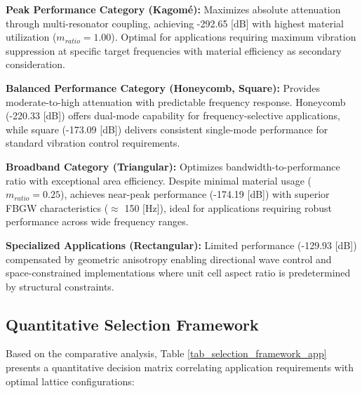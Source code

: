 \documentclass[review,numbers,sort&compress]{elsarticle}
\begin{document}
{\textbf{Peak Performance Category (Kagomé):} Maximizes absolute attenuation through multi-resonator coupling, achieving -292.65 [dB] with highest material utilization ($m_{ratio} = 1.00$). Optimal for applications requiring maximum vibration suppression at specific target frequencies with material efficiency as secondary consideration.

\textbf{Balanced Performance Category (Honeycomb, Square):} Provides moderate-to-high attenuation with predictable frequency response. Honeycomb (-220.33 [dB]) offers dual-mode capability for frequency-selective applications, while square (-173.09 [dB]) delivers consistent single-mode performance for standard vibration control requirements.

\textbf{Broadband Category (Triangular):} Optimizes bandwidth-to-performance ratio with exceptional area efficiency. Despite minimal material usage ($m_{ratio} = 0.25$), achieves near-peak performance (-174.19 [dB]) with superior FBGW characteristics ($\approx$ 150 [Hz]), ideal for applications requiring robust performance across wide frequency ranges.

\textbf{Specialized Applications (Rectangular):} Limited performance (-129.93 [dB]) compensated by geometric anisotropy enabling directional wave control and space-constrained implementations where unit cell aspect ratio is predetermined by structural constraints.

\subsection{Quantitative Selection Framework}

Based on the comparative analysis, Table \ref{tab_selection_framework_app} presents a quantitative decision matrix correlating application requirements with optimal lattice configurations:

}
\end{document}

